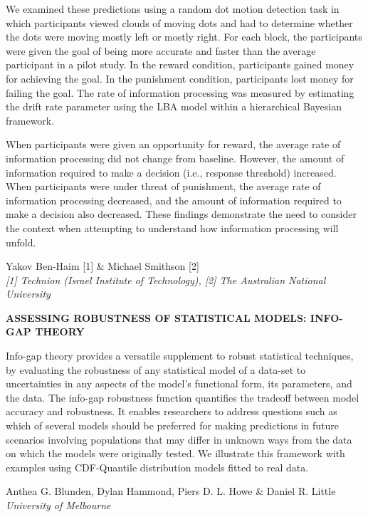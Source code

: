 \documentclass[]{article}
\begin{document}
We examined these predictions using a random dot motion detection task
in which participants viewed clouds of moving dots and had to determine
whether the dots were moving mostly left or mostly right. For each
block, the participants were given the goal of being more accurate and
faster than the average participant in a pilot study. In the reward
condition, participants gained money for achieving the goal. In the
punishment condition, participants lost money for failing the goal. The
rate of information processing was measured by estimating the drift rate
parameter using the LBA model within a hierarchical Bayesian framework.

When participants were given an opportunity for reward, the average rate
of information processing did not change from baseline. However, the
amount of information required to make a decision (i.e., response
threshold) increased. When participants were under threat of punishment,
the average rate of information processing decreased, and the amount of
information required to make a decision also decreased. These findings
demonstrate the need to consider the context when attempting to
understand how information processing will unfold.\\
\pagebreak  

Yakov Ben-Haim {[}1{]} \& Michael Smithson {[}2{]}\\
\emph{{[}1{]} Technion (Israel Institute of Technology), {[}2{]} The
Australian National University}

\textbf{ASSESSING ROBUSTNESS OF STATISTICAL MODELS: INFO-GAP THEORY}

Info-gap theory provides a versatile supplement to robust statistical
techniques, by evaluating the robustness of any statistical model of a
data-set to uncertainties in any aspects of the model's functional form,
its parameters, and the data. The info-gap robustness function
quantifies the tradeoff between model accuracy and robustness. It
enables researchers to address questions such as which of several models
should be preferred for making predictions in future scenarios involving
populations that may differ in unknown ways from the data on which the
models were originally tested. We illustrate this framework with
examples using CDF-Quantile distribution models fitted to real data.\\
\pagebreak  

Anthea G. Blunden, Dylan Hammond, Piers D. L. Howe \& Daniel R. Little\\
\emph{University of Melbourne}
\end{document}
